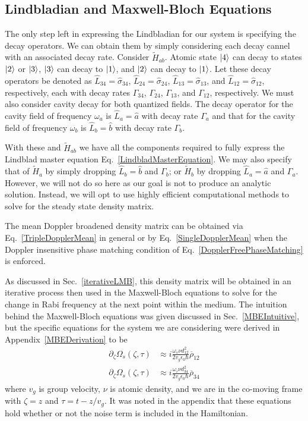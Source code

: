 \documentclass[aps,pra,showpacs,amsmath,amssymb,nofootinbib,longbibliography,superscriptaddress
]{revtex4-1}
\DeclarePairedDelimiter\ket{\lvert}{\rangle}
\theoremstyle{definition}
\theoremstyle{remark}
\newcommand{\0}{\hat{0}}
\begin{document}
\subsection{Lindbladian and Maxwell-Bloch Equations}\label{LMBE}

The only step left in expressing the Lindbladian for our system is specifying the decay operators. We can obtain them by simply considering each decay cannel with an associated decay rate. Consider $\tilde{H}_{ab}$. Atomic state $\ket{4}$ can decay to states $\ket{2}$ or $\ket{3}$, $\ket{3}$ can decay to $\ket{1}$, and $\ket{2}$ can decay to $\ket{1}$. Let these decay operators be denoted as $\hat{L}_{34} = \hat{\sigma}_{34}$, $\hat{L}_{24} = \hat{\sigma}_{24}$, $\hat{L}_{13} = \hat{\sigma}_{13}$, and $\hat{L}_{12} = \hat{\sigma}_{12}$, respectively, each with decay rates $\Gamma_{34}$, $\Gamma_{24}$, $\Gamma_{13}$, and $\Gamma_{12}$, respectively. We must also consider cavity decay for both quantized fields. The decay operator for the cavity field of frequency $\omega_a$ is $\hat{L}_{a} = \hat{a}$ with decay rate $\Gamma_a$ and that for the cavity field of frequency $\omega_b$ is $\hat{L}_{b} = \hat{b}$ with decay rate $\Gamma_b$.

With these and $\tilde{H}_{ab}$ we have all the components required to fully express the Lindblad master equation Eq.~\eqref{LindbladMasterEquation}. We may also specify that of $\tilde{H}_{a}$ by simply dropping $\hat{L}_{b} = \hat{b}$ and $\Gamma_b$; or $\tilde{H}_{b}$ by dropping $\hat{L}_{a} = \hat{a}$ and $\Gamma_a$. However, we will not do so here as our goal is not to produce an analytic solution. Instead, we will opt to use highly efficient computational methods to solve for the steady state density matrix.

The mean Doppler broadened density matrix can be obtained via Eq.~\eqref{TripleDopplerMean} in general or by Eq.~\eqref{SingleDopplerMean} when the Doppler insensitive phase matching condition of Eq.~\eqref{DopplerFreePhaseMatching} is enforced.

As discussed in Sec.~\ref{iterativeLMB}, this density matrix will be obtained in an iterative process then used in the Maxwell-Bloch equations to solve for the change in Rabi frequency at the next point within the medium. The intuition behind the Maxwell-Bloch equations was given discussed in Sec.~\ref{MBEIntuitive}, but the specific equations for the system we are considering were derived in Appendix~\ref{MBEDerivation} to be
\begin{align}
    \partial_\zeta \Omega_s(\zeta, \tau)
    &\approx
    i \frac{\omega_s \nu d_{12}^2}{2 v_g \epsilon_0 \hbar} \overline{\rho}_{12} \label{MBE1}\\
    \partial_\zeta \Omega_s(\zeta, \tau)
    &\approx
    i \frac{\omega_i \nu d_{34}^2}{2 v_g \epsilon_0 \hbar} \overline{\rho}_{34}\label{MBE2}
\end{align}
where $v_g$ is group velocity, $\nu$ is atomic density, and we are in the co-moving frame with $\zeta = z$ and $\tau = t - z/v_g$. It was noted in the appendix that these equations hold whether or not the noise term is included in the Hamiltonian.
\end{document}
